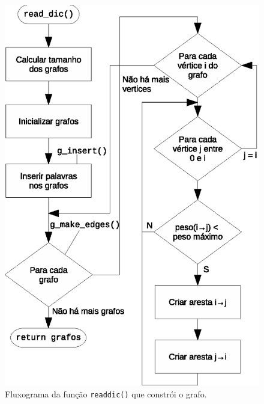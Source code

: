 \documentclass[a4paper, 18pt]{article}
\newcommand\tu[0]{\textunderscore}
\begin{document}
	\begin{figure}[H]
		\centering
		\includegraphics[width=1\linewidth]{read_dic}
		\caption{Fluxograma da função \texttt{read\tu dic()} que constrói o grafo.}
	\end{figure}
\end{document}
